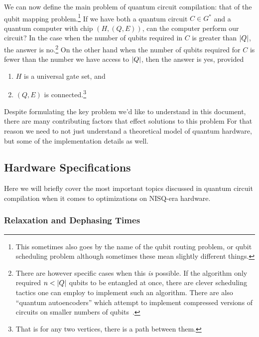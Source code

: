 We can now define the main problem of quantum circuit compilation: that of the qubit mapping problem.\footnote{This sometimes also goes by the name of the qubit routing problem, or qubit scheduling problem although sometimes these mean slightly different things.}
If we have both a quantum circuit $C \in G^*$ and a quantum computer with chip $(H, (Q, E))$, can the computer perform our circuit? %
In the case when the number of qubits required in $C$ is greater than $\abs{Q}$, the answer is no.\footnote{There are however specific cases when this \emph{is} possible. If the algorithm only required $n < \abs{Q}$ qubits to be entangled at once, there are clever scheduling tactics one can employ to implement such an algorithm. There are also ``quantum autoencoders'' which attempt to implement compressed versions of circuits on smaller numbers of qubits~\cite{autoencode}.}
On the other hand when the number of qubits required for $C$ is fewer than the number we have access to $\abs{Q}$, then the answer is yes, provided
\begin{enumerate}
    \item $H$ is a universal gate set, and
    \item $(Q, E)$ is connected.\footnote{That is for any two vertices, there is a path between them.}
\end{enumerate}
Despite formulating the key problem we'd like to understand in this document, there are many contributing factors that effect solutions to this problem
For that reason we need to not just understand a theoretical model of quantum hardware, but some of the implementation details as well.

\subsection{Hardware Specifications}

Here we will briefly cover the most important topics discussed in quantum circuit compilation when it comes to optimizations on \ac{NISQ}-era hardware.

\subsubsection{Relaxation and Dephasing Times}\label{sec:Ttimes}

